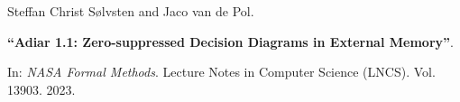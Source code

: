 Steffan Christ Sølvsten and Jaco van de Pol.

{\bf ``Adiar 1.1: Zero-suppressed Decision Diagrams in External Memory''}.

In: \emph{NASA Formal Methods}. Lecture Notes in Computer
Science (LNCS). Vol. 13903. 2023.

\label{cite:2023.nfm}